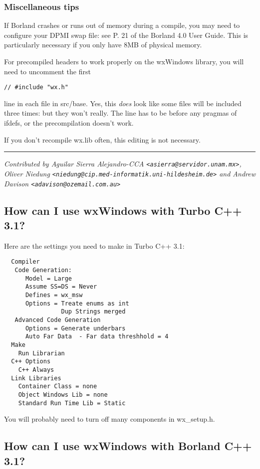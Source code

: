 \subsubsection{Miscellaneous tips}

If Borland crashes or runs out of memory during a compile, you
may need to configure your DPMI swap file: see P. 21 of the Borland 4.0
User Guide. This is particularly necessary if you only have 8MB of physical
memory.

For precompiled headers to work properly on the wxWindows library,
you will need to uncomment the first

\begin{verbatim}
// #include "wx.h"
\end{verbatim}

line in each file in src/base. Yes, this {\it does} look like some files will
be included three times: but they won't really. The line has to be before
any pragmas of ifdefs, or the precompilation doesn't work.

If you don't recompile wx.lib often, this editing is not necessary.

\hrule
{\it Contributed by Aguilar Sierra Alejandro-CCA \verb$<asierra@servidor.unam.mx>$, Oliver Niedung \verb$<niedung@cip.med-informatik.uni-hildesheim.de>$ and
Andrew Davison \verb$<adavison@ozemail.com.au>$}

\subsection{How can I use wxWindows with Turbo C++ 3.1?}

Here are the settings you need to make in Turbo C++ 3.1:

\begin{verbatim}
  Compiler
   Code Generation:
      Model = Large
      Assume SS=DS = Never
      Defines = wx_msw
      Options = Treate enums as int
                Dup Strings merged
   Advanced Code Generation
      Options = Generate underbars
      Auto Far Data  - Far data threshhold = 4
  Make
    Run Librarian
  C++ Options
    C++ Always
  Link Libraries
    Container Class = none
    Object Windows Lib = none
    Standard Run Time Lib = Static
\end{verbatim}

You will probably need to turn off many components in wx\_setup.h.

\subsection{How can I use wxWindows with Borland C++ 3.1?}

